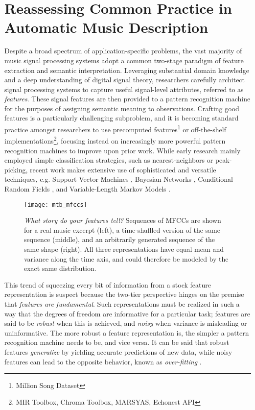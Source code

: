 \section{Reassessing Common Practice in Automatic Music Description}
\label{sec:common}

Despite a broad spectrum of application-specific problems, the vast majority of music signal processing systems adopt a common two-stage paradigm of feature extraction and semantic interpretation.
Leveraging substantial domain knowledge and a deep understanding of digital signal theory, researchers carefully architect signal processing systems to capture useful signal-level attributes, referred to as \emph{features}.
These signal features are then provided to a pattern recognition machine for the purposes of assigning semantic meaning to observations.
Crafting good features is a particularly challenging subproblem, and it is becoming standard practice amongst researchers to use precomputed features\footnote{Million Song Dataset} or off-the-shelf implementations\footnote{MIR Toolbox, Chroma Toolbox, MARSYAS, Echonest API}, focusing instead on increasingly more powerful pattern recognition machines to improve upon prior work.
While early research mainly employed simple classification strategies, such as nearest-neighbors or peak-picking, recent work makes extensive use of sophisticated and versatile techniques, e.g. Support Vector Machines \cite{Mandel2005Song}, Bayesian Networks \cite{Mauch2010Approximate}, Conditional Random Fields \cite{Sumi2012Music}, and Variable-Length Markov Models \cite{Chordia2011Predictive}.

\begin{figure}
\begin{centering}
\texttt{[image: mtb\_mfccs]}
\caption{\emph{What story do your features tell?} Sequences of MFCCs are shown for a real music excerpt (left), a time-shuffled version of the same sequence (middle), and an arbitrarily generated sequence of the same shape (right). All three representations have equal mean and variance along the time axis, and could therefore be modeled by the exact same distribution.}
\label{fig:mfccs}
\end{centering}
\end{figure}

This trend of squeezing every bit of information from a stock feature representation is suspect because the two-tier perspective hinges on the premise that \emph{features are fundamental}.
Such representations must be realized in such a way that the degrees of freedom are informative for a particular task; features are said to be \emph{robust} when this is achieved, and \emph{noisy} when variance is misleading or uninformative.
The more robust a feature representation is, the simpler a pattern recognition machine needs to be, and vice versa.
It can be said that robust features \emph{generalize} by yielding accurate predictions of new data, while noisy features can lead to the opposite behavior, known as \emph{over-fitting} \cite{Bishop2006Pattern}.

